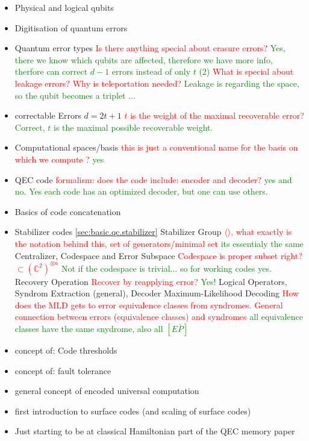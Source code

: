 \begin{itemize}
    \item Physical and logical qubits 
    \item Digitisation of quantum errors
    \item Quantum error types  
    \subitem \textcolor{red}{Is there anything special about erasure errors? }
    \subitem \textcolor{green}{Yes, there we know which qubits are affected, therefore we have more info, therfore can correct $d-1$ errors instead of only $t$ ($2$)}
    \subitem \textcolor{red}{What is special about leakage errors? Why is teleportation needed?}
    \subitem \textcolor{green}{Leakage is regarding the space, so the qubit becomes a triplet ...}
    \item correctable Errors $d=2t+1$ 
    \subitem \textcolor{red}{$t$ is the weight of the maximal recoverable error?}
    \subitem \textcolor{green}{Correct, $t$ is the maximal possible recoverable weight.} 
    \item Computational spaces/basis
    \subitem \textcolor{red}{this is just a conventional name for the basis on which we compute ?}
    \subitem \textcolor{green}{yes}
    \item  QEC code 
    \subitem \textcolor{red}{formalism: does the code include: encoder and decoder?}
    \subitem \textcolor{green}{yes and no. Yes each code has an optimized decoder, but one can use others.}
    \item Basics of code concatenation
    \item Stabilizer codes \ref{sec:basic.qc.stabilizer} 
    \subitem Stabilizer Group 
    \subitem \textcolor{red}{$\langle \rangle$, what exactly is the notation behind this, set of generators/minimal set}
    \subitem \textcolor{green}{its essentialy the same} 
    \subitem Centralizer, 
    \subitem Codespace and Error Subspace
    \subitem \textcolor{red}{Codespace is proper subset right? $\subset (\mathbb{C}^2)^{\otimes n}$}
    \subitem \textcolor{green}{Not if the codespace is trivial... so for working codes yes.}
    \subitem Recovery Operation
    \subitem \textcolor{red}{Recover by reapplying error?}
    \subitem \textcolor{green}{Yes!}
    \subitem Logical Operators, Syndrom Extraction (general), Decoder
    \subitem Maximum-Likelihood Decoding
    \subitem \textcolor{red}{How does the MLD gets to error equivalence classes from syndromes. General connection between errors (equivalence classes) and syndromes}
    \subitem \textcolor{green}{all equivalence classes have the same snydrome, also all $[E\bar{P}]$}
    \item concept of: Code thresholds
    \item concept of: fault tolerance  
    \item general concept of encoded universal computation 
    \item first introduction to surface codes (and scaling of surface codes)
    \item Just starting to be at classical Hamiltonian part of the QEC memory paper

\end{itemize}


